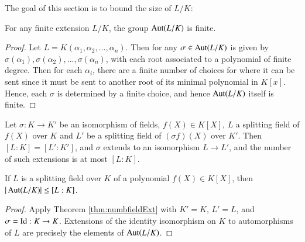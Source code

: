 \documentclass[12pt, a4paper, oneside, openright, titlepage]{book}
\begin{document}
The goal of this section is to bound the size of $L/K$:

\begin{thm}
    For any finite extension $L/K$, the group $\operatorname{Aut}(L/K)$ is finite.
\end{thm}
\begin{proof}
    Let $L = K(\alpha_1,\alpha_2,...,\alpha_n)$. Then for any $\sigma \in \operatorname{Aut}(L/K)$ is given by $\sigma(\alpha_1),\sigma(\alpha_2),...,\sigma(\alpha_n)$, with each root associated to a polynomial of finite degree. Then for each $\alpha_i$, there are a finite number of choices for where it can be sent since it must be sent to another root of its minimal polynomial in $K[x]$. Hence, each $\sigma$ is determined by a finite choice, and hence $\operatorname{Aut}(L/K)$ itself is finite.
\end{proof}


\begin{thm}\label{thm:numbfieldExt}
    Let $\sigma:K\rightarrow K'$ be an isomorphism of fields, $f(X) \in K[X]$, $L$ a splitting field of $f(X)$ over $K$ and $L'$ be a splitting field of $(\sigma f)(X)$ over $K'$. Then $[L:K] = [L':K']$, and $\sigma$ extends to an isomorphism $L\rightarrow L'$, and the number of such extensions is at most $[L:K]$.
\end{thm}


\begin{cor}
    If $L$ is a splitting field over $K$ of a polynomial $f(X) \in K[X]$, then $|\operatorname{Aut}(L/K)| \leq [L:K]$.
\end{cor}
\begin{proof}
    Apply Theorem \ref{thm:numbfieldExt} with $K' = K$, $L' = L$, and $\sigma = \operatorname{Id}:K\rightarrow K$. Extensions of the identity isomorphism on $K$ to automorphisms of $L$ are precisely the elements of $\operatorname{Aut}(L/K)$. 
\end{proof}
\end{document}
